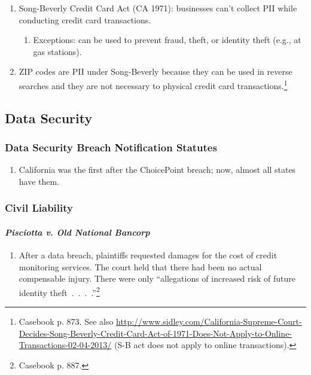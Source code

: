\begin{enumerate}
    \item Song-Beverly Credit Card Act (CA 1971): businesses can't collect PII 
    while conducting credit card transactions. 
    \begin{enumerate}
        \item Exceptions: can be used to prevent fraud, theft, or identity 
        theft (e.g., at gas stations).
    \end{enumerate}
    \item ZIP codes are PII under Song-Beverly because they can be used in 
    reverse searches and they are not necessary to physical credit card 
    transactions.\footnote{Casebook p. 873. See also 
    \url{http://www.sidley.com/California-Supreme-Court-Decides-Song-Beverly-Credit-Card-Act-of-1971-Does-Not-Apply-to-Online-Transactions-02-04-2013/} 
    (S-B act does not apply to online transactions).}
\end{enumerate}

\subsection{Data Security}

\subsubsection{Data Security Breach Notification Statutes}

\begin{enumerate}
    \item California was the first after the ChoicePoint breach; now, almost all 
    states have them.
\end{enumerate}

\subsubsection{Civil Liability}

\paragraph{\emph{Pisciotta v. Old National Bancorp}}

\begin{enumerate}
    \item After a data breach, plaintiffs requested damages for the cost of 
    credit monitoring services. The court held that there had been no actual 
    compensable injury. There were only ``allegations of increased risk of 
    future identity theft~.~.~.~.''\footnote{Casebook p. 887.}
\end{enumerate}


